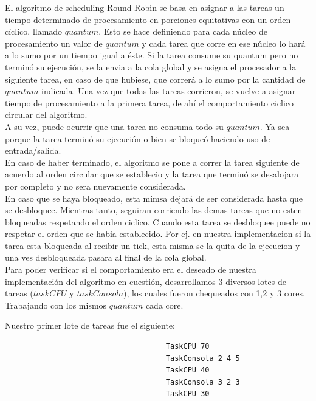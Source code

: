 \indent El algoritmo de scheduling Round-Robin se basa en asignar a las tareas un tiempo determinado de procesamiento en porciones equitativas  con un orden cíclico, llamado
$quantum$. 
Esto se hace definiendo para cada núcleo de procesamiento un valor de $quantum$ y cada tarea que corre en ese núcleo lo hará a lo sumo por un tiempo igual a éste. 
Si la tarea consume su quantum pero no terminó su ejecución, se la envia a la cola global y se asigna el procesador a la siguiente tarea, en 
caso de que hubiese, que correrá a lo sumo por la cantidad de $quantum$ indicada. 
Una vez que todas las tareas corrieron, se vuelve a asignar tiempo de procesamiento a la primera tarea, 
de ahí el comportamiento ciclico circular del algoritmo.\\
\indent A su vez, puede ocurrir que una tarea no consuma todo su $quantum$. Ya sea porque 
la tarea terminó su ejecución o bien se bloqueó haciendo uso de entrada/salida.\\
\indent En caso de haber terminado, el algoritmo se pone a correr la tarea siguiente de acuerdo al orden circular que se 
establecio y la tarea que terminó se desalojara por completo y no sera nuevamente considerada.\\
\indent En caso que se haya bloqueado, esta mimsa dejará de ser considerada hasta que se desbloquee. Mientras tanto,
seguiran corriendo las demas tareas que no esten bloqueadas respetando el orden ciclico.
Cuando esta tarea se desbloquee puede no respetar el orden que se habia establecido. Por ej. en nuestra implementacion
si la tarea esta bloqueada al recibir un tick, esta misma se la quita de la ejecucion y una ves desbloqueada pasara al final de
la cola global.\\

\indent Para poder verificar si el comportamiento era el deseado de nuestra implementación del algoritmo en cuestión, 
desarrollamos 3 diversos lotes de tareas ($taskCPU$ y $taskConsola$), los cuales fueron chequeados con 1,2 y 3 cores.\\
Trabajando con los mismos $quantum$ cada core.
\indent

Nuestro primer lote de tareas fue el siguiente:
\begin{verbatim}
                                     TaskCPU 70
                                     TaskConsola 2 4 5
                                     TaskCPU 40
                                     TaskConsola 3 2 3
                                     TaskCPU 30
\end{verbatim}

